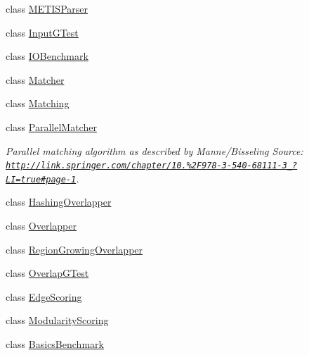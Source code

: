 \begin{DoxyCompactItemize}
class \hyperlink{class_ensemble_clustering_1_1_m_e_t_i_s_parser}{M\-E\-T\-I\-S\-Parser}
\item 
class \hyperlink{class_ensemble_clustering_1_1_input_g_test}{Input\-G\-Test}
\item 
class \hyperlink{class_ensemble_clustering_1_1_i_o_benchmark}{I\-O\-Benchmark}
\item 
class \hyperlink{class_ensemble_clustering_1_1_matcher}{Matcher}
\item 
class \hyperlink{class_ensemble_clustering_1_1_matching}{Matching}
\item 
class \hyperlink{class_ensemble_clustering_1_1_parallel_matcher}{Parallel\-Matcher}
\begin{DoxyCompactList}\small\item\em Parallel matching algorithm as described by Manne/\-Bisseling Source\-: \href{http://link.springer.com/chapter/10.1007%2F978-3-540-68111-3_74?LI=true#page-1}{\tt http\-://link.\-springer.\-com/chapter/10.\-1007\%2\-F978-\/3-\/540-\/68111-\/3\-\_\-74?\-L\-I=true\#page-\/1}. \end{DoxyCompactList}\item 
class \hyperlink{class_ensemble_clustering_1_1_hashing_overlapper}{Hashing\-Overlapper}
\item 
class \hyperlink{class_ensemble_clustering_1_1_overlapper}{Overlapper}
\item 
class \hyperlink{class_ensemble_clustering_1_1_region_growing_overlapper}{Region\-Growing\-Overlapper}
\item 
class \hyperlink{class_ensemble_clustering_1_1_overlap_g_test}{Overlap\-G\-Test}
\item 
class \hyperlink{class_ensemble_clustering_1_1_edge_scoring}{Edge\-Scoring}
\item 
class \hyperlink{class_ensemble_clustering_1_1_modularity_scoring}{Modularity\-Scoring}
\item 
class \hyperlink{class_ensemble_clustering_1_1_basics_benchmark}{Basics\-Benchmark}
\end{DoxyCompactItemize}

